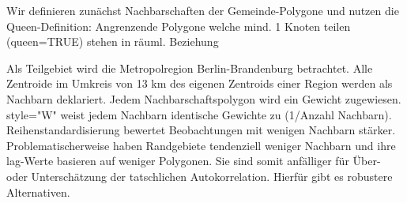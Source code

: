 Wir definieren zunächst Nachbarschaften der Gemeinde-Polygone und nutzen die Queen-Definition: 
Angrenzende Polygone welche mind. 1 Knoten teilen (queen=TRUE) stehen in räuml. Beziehung


 Als Teilgebiet wird die Metropolregion Berlin-Brandenburg betrachtet. 
 Alle Zentroide im Umkreis von 13 km des eigenen Zentroids einer Region werden als Nachbarn deklariert.
 Jedem Nachbarschaftspolygon wird ein Gewicht zugewiesen. style="W" weist jedem Nachbarn identische Gewichte zu (1/Anzahl Nachbarn). 
 Reihenstandardisierung bewertet Beobachtungen mit wenigen Nachbarn stärker. 
 Problematischerweise haben Randgebiete tendenziell weniger Nachbarn und ihre lag-Werte basieren auf weniger Polygonen. 
 Sie sind somit anfälliger für Über- oder Unterschätzung der tatschlichen Autokorrelation. Hierfür gibt es robustere Alternativen.

